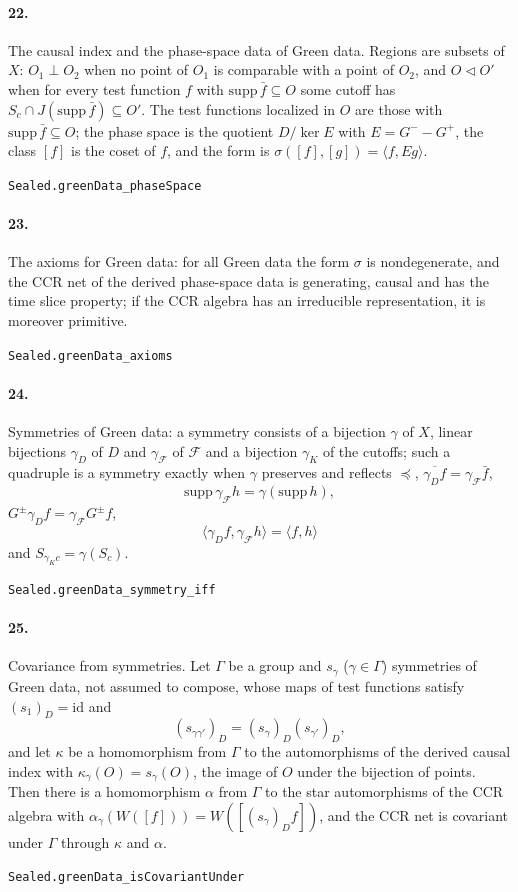 \documentclass[11pt]{article}
\begin{document}
\paragraph{22.} The causal index and the phase-space data of Green data. Regions are subsets of $X$: $O_1 \perp O_2$ when no point of $O_1$ is comparable with a point of $O_2$, and $O \triangleleft O'$ when for every test function $f$ with $\mathrm{supp}\, \bar f \subseteq O$ some cutoff has $S_c \cap J(\mathrm{supp}\, \bar f) \subseteq O'$. The test functions localized in $O$ are those with $\mathrm{supp}\, \bar f \subseteq O$; the phase space is the quotient $D / \ker E$ with $E = G^- - G^+$, the class $[f]$ is the coset of $f$, and the form is $\sigma([f], [g]) = \langle f, E g \rangle$.\par{\footnotesize\texttt{Sealed.greenData\_phaseSpace}}

\paragraph{23.} The axioms for Green data: for all Green data the form $\sigma$ is nondegenerate, and the CCR net of the derived phase-space data is generating, causal and has the time slice property; if the CCR algebra has an irreducible representation, it is moreover primitive.\par{\footnotesize\texttt{Sealed.greenData\_axioms}}

\paragraph{24.} Symmetries of Green data: a symmetry consists of a bijection $\gamma$ of $X$, linear bijections $\gamma_D$ of $D$ and $\gamma_{\mathcal F}$ of $\mathcal F$ and a bijection $\gamma_K$ of the cutoffs; such a quadruple is a symmetry exactly when $\gamma$ preserves and reflects $\preceq$, $\overline{\gamma_D f} = \gamma_{\mathcal F} \bar f$, \[\mathrm{supp}\, \gamma_{\mathcal F} h = \gamma(\mathrm{supp}\, h),\] $G^\pm \gamma_D f = \gamma_{\mathcal F} G^\pm f$, \[\langle \gamma_D f, \gamma_{\mathcal F} h \rangle = \langle f, h \rangle\] and $S_{\gamma_K c} = \gamma(S_c)$.\par{\footnotesize\texttt{Sealed.greenData\_symmetry\_iff}}

\paragraph{25.} Covariance from symmetries. Let $\Gamma$ be a group and $s_\gamma$ ($\gamma \in \Gamma$) symmetries of Green data, not assumed to compose, whose maps of test functions satisfy $(s_1)_D = \mathrm{id}$ and \[(s_{\gamma\gamma'})_D = (s_\gamma)_D (s_{\gamma'})_D,\] and let $\kappa$ be a homomorphism from $\Gamma$ to the automorphisms of the derived causal index with $\kappa_\gamma(O) = s_\gamma(O)$, the image of $O$ under the bijection of points. Then there is a homomorphism $\alpha$ from $\Gamma$ to the star automorphisms of the CCR algebra with $\alpha_\gamma(W([f])) = W([(s_\gamma)_D f])$, and the CCR net is covariant under $\Gamma$ through $\kappa$ and $\alpha$.\par{\footnotesize\texttt{Sealed.greenData\_isCovariantUnder}}
\end{document}
